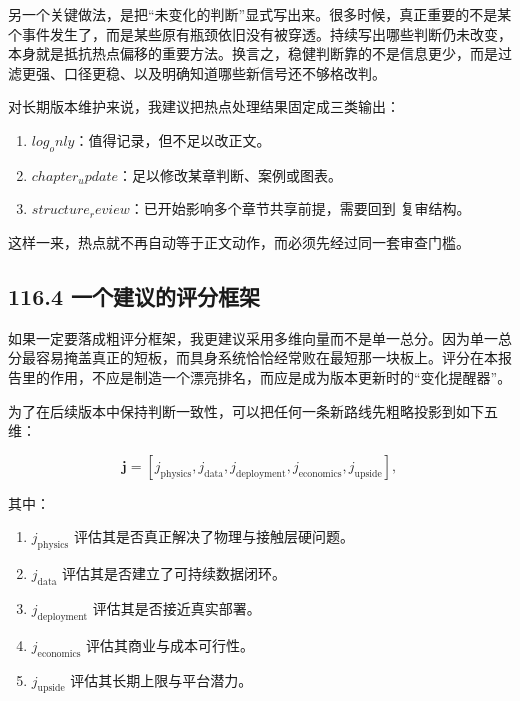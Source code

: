 另一个关键做法，是把“未变化的判断”显式写出来。很多时候，真正重要的不是某个事件发生了，而是某些原有瓶颈依旧没有被穿透。持续写出哪些判断仍未改变，本身就是抵抗热点偏移的重要方法。换言之，稳健判断靠的不是信息更少，而是过滤更强、口径更稳、以及明确知道哪些新信号还不够格改判。

对长期版本维护来说，我建议把热点处理结果固定成三类输出：

\begin{enumerate}
\item \(log_only\)：值得记录，但不足以改正文。
\item \(chapter_update\)：足以修改某章判断、案例或图表。
\item \(structure_review\)：已开始影响多个章节共享前提，需要回到  复审结构。
\end{enumerate}

这样一来，热点就不再自动等于正文动作，而必须先经过同一套审查门槛。

\subsection*{116.4 一个建议的评分框架}


如果一定要落成粗评分框架，我更建议采用多维向量而不是单一总分。因为单一总分最容易掩盖真正的短板，而具身系统恰恰经常败在最短那一块板上。评分在本报告里的作用，不应是制造一个漂亮排名，而应是成为版本更新时的“变化提醒器”。

为了在后续版本中保持判断一致性，可以把任何一条新路线先粗略投影到如下五维：

\begingroup
\scriptsize
\begin{equation*}
\mathbf{j} = [j_{\text{physics}}, j_{\text{data}}, j_{\text{deployment}}, j_{\text{economics}}, j_{\text{upside}}],
\end{equation*}
\endgroup

其中：

\begin{enumerate}
\item \(j_{\text{physics}}\) 评估其是否真正解决了物理与接触层硬问题。
\item \(j_{\text{data}}\) 评估其是否建立了可持续数据闭环。
\item \(j_{\text{deployment}}\) 评估其是否接近真实部署。
\item \(j_{\text{economics}}\) 评估其商业与成本可行性。
\item \(j_{\text{upside}}\) 评估其长期上限与平台潜力。
\end{enumerate}

